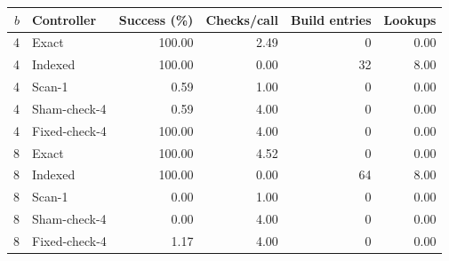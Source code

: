 \begin{tabular}{rlrrrr}
\toprule
$b$ & Controller & Success (\%) & Checks/call & Build entries & Lookups\\
\midrule
4 & Exact & 100.00 & 2.49 & 0 & 0.00\\
4 & Indexed & 100.00 & 0.00 & 32 & 8.00\\
4 & Scan-1 & 0.59 & 1.00 & 0 & 0.00\\
4 & Sham-check-4 & 0.59 & 4.00 & 0 & 0.00\\
4 & Fixed-check-4 & 100.00 & 4.00 & 0 & 0.00\\
8 & Exact & 100.00 & 4.52 & 0 & 0.00\\
8 & Indexed & 100.00 & 0.00 & 64 & 8.00\\
8 & Scan-1 & 0.00 & 1.00 & 0 & 0.00\\
8 & Sham-check-4 & 0.00 & 4.00 & 0 & 0.00\\
8 & Fixed-check-4 & 1.17 & 4.00 & 0 & 0.00\\
\bottomrule
\end{tabular}
